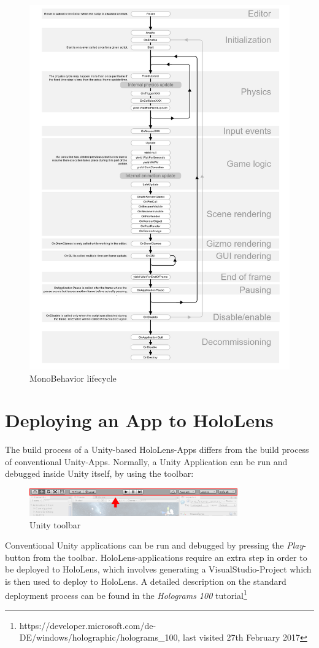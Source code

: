 \begin{figure}[H]
  \centering
  \includegraphics[width=1\textwidth]{images/MonoBehaviourFlowChart.png}
  \caption{MonoBehavior lifecycle}
\end{figure}

\newpage
\section{Deploying an App to HoloLens}
The build process of a Unity-based HoloLens-Apps differs from the build process of conventional Unity-Apps. Normally, a Unity Application can be run and debugged inside Unity itself, by using the toolbar:
\begin{figure}[H]
  \centering
  \includegraphics[width=0.8\textwidth]{images/Toolbar.png}
  \caption{Unity toolbar}
\end{figure} 
Conventional Unity applications can be run and debugged by pressing the \textit{Play}-button from the toolbar. HoloLens-applications require an extra step in order to be deployed to HoloLens, which involves generating a VisualStudio-Project which is then used to deploy to HoloLens. A detailed description on the standard deployment process can be found in the \textit{Holograms 100} tutorial\footnote[2]{https://developer.microsoft.com/de-DE/windows/holographic/holograms\_100, last visited 27th February 2017}

